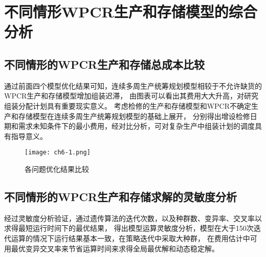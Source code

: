 %
%
%
%
%

\chapter{不同情形WPCR生产和存储模型的综合分析}

\section{不同情形的WPCR生产和存储总成本比较}

通过前面四个模型优化结果可知，连续多周生产统筹规划模型相较于不允许缺货的WPCR生产和存储模型增加组装迟滞，
由图表可以看出其费用大大升高，对研究组装分配计划具有重要现实意义。
考虑检修的生产和存储模型和WPCR不确定生产和存储模型在连续多周生产统筹规划模型的基础上展开，
分别得出增设检修日期和需求未知条件下的最小费用，经对比分析，可对复杂生产中组装计划的调度具有指导意义。

\begin{figure}[h]
    \centering
    \texttt{[image: ch6-1.png]}
    \caption{各问题优化结果比较}
    \label{f.ch6-1}
\end{figure}

\section{不同情形的WPCR生产和存储求解的灵敏度分析}

经过灵敏度分析验证，通过遗传算法的迭代次数，以及种群数、变异率、交叉率以求得最短运行时间下的最优结果，
得出模型运算灵敏度分析，模型在大于150次迭代运算的情况下运行结果基本一致，在策略迭代中采取大种群，
在费用估计中可用最优变异交叉率来节省运算时间来求得全局最优解和动态稳定解。

